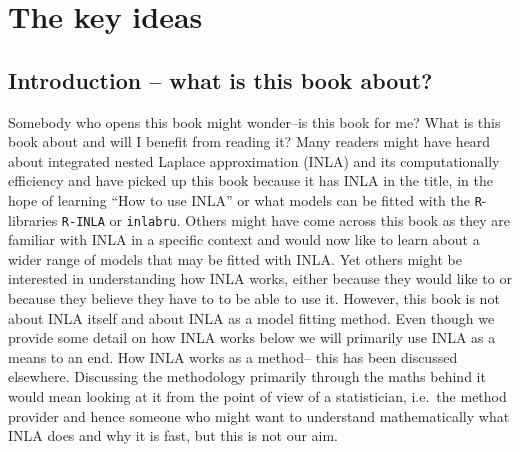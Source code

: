 
\chapter{The key ideas}


\section{Introduction -- what is this book about?}
Somebody who opens this book might wonder--is this book for me? What is this book about and will I benefit from reading it? Many readers might have heard about integrated nested Laplace approximation (INLA) and its computationally efficiency and have picked up this book because it has INLA in the title, in the hope of 
learning ``How to use INLA'' or what models can be fitted with the \texttt{R}-libraries \texttt{R-INLA} or \texttt{inlabru}. Others might have come across this book as they are familiar with INLA in a specific context and would now like to learn about a wider range of models that may be fitted with INLA. Yet others might be interested in understanding how INLA works, either because they would like to or because they believe they have to to be able to use it. However, this book is not about INLA itself and about INLA as a model fitting method. Even though we provide some detail on how INLA works below we will primarily use INLA as a means to an end. How INLA works as a method-- this has been discussed elsewhere. Discussing the methodology primarily through the maths behind it would mean looking at it from the point of view of a statistician, i.e.\ the method provider and hence someone who might want to understand mathematically what INLA does and why it is fast, but this is not our aim.

